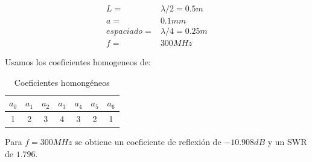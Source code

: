 \documentclass[11pt]{book}
\begin{document}
\begin{align*}
	L = &\lambda/2 =  0.5m \\
	a = & 0.1mm \\
	espaciado = & \lambda / 4 = 0.25m \\
	f = & 300MHz
\end{align*}

Usamos los coeficientes homogeneos de:
\begin{table}[!ht]
	\centering
	\begin{tabular}{c|c|c|c|c|c|c}
		$a_0$ & $a_1$ & $a_2$ & $a_3$ & $a_4$ & $a_5$ & $a_6$ \\ \hline
		1 & 2 & 3 & 4 & 3 & 2 & 1 \\
	\end{tabular}
	\caption{Coeficientes homongéneos}
	\label{tab:5}
\end{table}

Para $f=300MHz$ se obtiene un coeficiente de reflexión de $-10.908dB$ y un SWR de $1.796$. 
\end{document}
